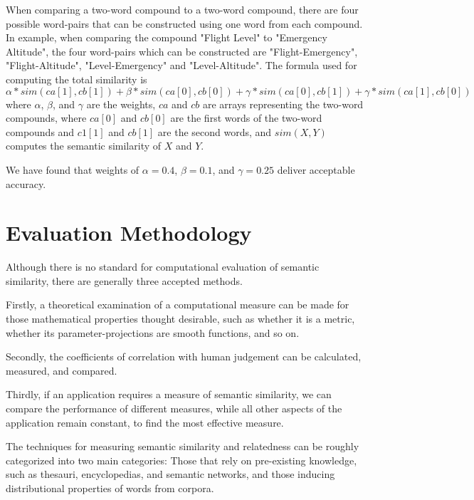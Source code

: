 \documentclass{article}
\begin{document}
When comparing a two-word compound to a two-word compound, there are four possible word-pairs that can be constructed using one word from each compound. In example, when comparing the compound "Flight Level" to "Emergency Altitude", the four word-pairs which can be constructed are "Flight-Emergency", "Flight-Altitude", "Level-Emergency" and "Level-Altitude".
The formula used for computing the total similarity is 
\begin{equation} \label{eq:2wordto2word}
	\alpha * sim(ca[1], cb[1]) + \beta * sim(ca[0], cb[0]) + \gamma * sim(ca[0], cb[1]) + \gamma * sim(ca[1], cb[0])
\end{equation}
where $ \alpha $, $ \beta $, and $ \gamma $ are the weights, $ ca $ and $ cb $ are arrays representing the two-word compounds, where $ ca[0] $ and $ cb[0] $ are the first words of the two-word compounds and $ c1[1] $ and $ cb[1] $ are the second words, and $ sim(X,Y) $ computes the semantic similarity of $ X $ and $ Y $. 

We have found that weights of $ \alpha = 0.4 $, $ \beta = 0.1 $, and $ \gamma = 0.25 $ deliver acceptable accuracy.

\section{Evaluation Methodology}

Although there is no standard for computational evaluation of semantic similarity, there are generally three accepted methods\cite{meng2013review}.

Firstly, a theoretical examination of a computational measure can be made for those mathematical properties thought desirable, such as whether it is a metric, whether its parameter-projections are smooth functions, and so on. %

Secondly, the coefficients of correlation with human judgement can be calculated, measured, and compared\cite{zhou2008new,seco2004intrinsic}.

Thirdly, if an application requires a measure of semantic similarity, we can compare the performance of different measures, while all other aspects of the application remain constant, to find the most effective measure\cite{blanchard2006tree,budanitsky2006evaluating}. %

The techniques for measuring semantic similarity and relatedness can be roughly categorized into two main categories\cite{agirre2009study}: Those that rely on pre-existing knowledge, such as thesauri, encyclopedias, and semantic networks\cite{alvarez2007graph,yang2005measuring,hughes2007lexical}, and those inducing distributional properties of words from corpora\cite{sahami2006web,chen2006novel,bollegala2007measuring}.
\end{document}
